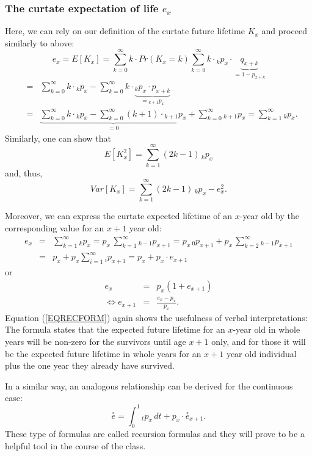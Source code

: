 \documentclass[11pt,fleqn,oneside]{book}
\begin{document}
\subsubsection*{The curtate expectation of life $e_x$}
Here, we can rely on our definition of the curtate future lifetime $K_x$ and proceed similarly to above:
$$
e_x = E[K_x] = \sum_{k=0}^{\infty} k \cdot Pr(K_x=k) \sum_{k=0}^{\infty} k\cdot{_kp_x}\cdot \underbrace{{q_{x+k}}}_{=1-{p_{x+k}}} 
$$
\begin{eqnarray*}
&=&  \sum_{k=0}^{\infty} k\cdot{_kp_x} -  \sum_{k=0}^{\infty} k\cdot \underbrace{{_kp_x}\cdot{p_{x+k}}}_{={_{k+1}p_x}} \\
&=& \underbrace{\sum_{k=0}^{\infty} k\cdot{_kp_x} - \sum_{k=0}^{\infty} (k+1)\cdot  {_{k+1}p_x}}_{=0} + \sum_{k=0}^{\infty} {_{k+1}p_x}
= \sum_{k=1}^{\infty} {_kp_x}.
\end{eqnarray*}
Similarly, one can show that
$$
E[K^2_x] = \sum_{k=1}^{\infty} (2k-1)\, {_kp_x}
$$
and, thus,
$$
Var[K_x] = \sum_{k=1}^{\infty} (2k-1)\, {_kp_x} - e^2_x.
$$

Moreover, we can express the curtate expected lifetime of an $x$-year old by the corresponding value for an $x+1$ year old:
\begin{eqnarray*}
e_x &=& \sum_{k=1}^{\infty} {_kp_x} = p_x \,\sum_{k=1}^{\infty} {_{k-1}p_{x+1}}
= p_x\,{_0p_{x+1}} + p_x\,\sum_{k=2}^{\infty} {_{k-1}p_{x+1}}  \\
&=& p_x + p_x \sum_{i=1}^{\infty} {_{i}p_{x+1}} = p_x + p_x \cdot e_{x+1}
\end{eqnarray*}
or
\begin{eqnarray}
e_{x} &=& p_x\left(1+e_{x+1}\right) \label{EQRECFORM} \\ 
\Leftrightarrow e_{x+1} &=& \frac{e_x - p_x}{p_x}.\nonumber
\end{eqnarray}
Equation (\ref{EQRECFORM}) again shows the usefulness of verbal interpretations: The formula states that the expected future lifetime for an $x$-year old in whole years will be non-zero for the survivors until age $x+1$ only, and for those it will be the expected future lifetime in whole years for an $x+1$ year old individual plus the one year they already have survived. 

In a similar way, an analogous relationship can be derived for the continuous case:
$$
\stackrel{\circ}{e} = \int_0^1 {_tp_x}\,dt + p_x\cdot \stackrel{\circ}{e}_{x+1}.
$$
These type of formulas are called recursion formulas and they will prove to be a helpful tool in the course of the class.
\end{document}
